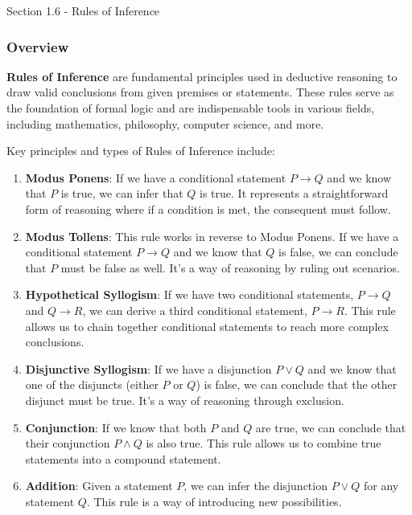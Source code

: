 \begin{notes}{Section 1.6 - Rules of Inference}
    \subsubsection*{Overview}

    \textbf{Rules of Inference} are fundamental principles used in deductive reasoning to draw valid conclusions from given premises or statements. These rules serve as the foundation of formal logic and are indispensable tools in various fields, including mathematics, philosophy, 
    computer science, and more.
    
    Key principles and types of Rules of Inference include:
    
    \begin{enumerate}
        \item \textbf{Modus Ponens}: If we have a conditional statement \(P \rightarrow Q\) and we know that \(P\) is true, we can infer that \(Q\) is true. It represents a straightforward form of reasoning where if a condition is met, the consequent must follow.
        
        \item \textbf{Modus Tollens}: This rule works in reverse to Modus Ponens. If we have a conditional statement \(P \rightarrow Q\) and we know that \(Q\) is false, we can conclude that \(P\) must be false as well. It's a way of reasoning by ruling out scenarios.
        
        \item \textbf{Hypothetical Syllogism}: If we have two conditional statements, \(P \rightarrow Q\) and \(Q \rightarrow R\), we can derive a third conditional statement, \(P \rightarrow R\). This rule allows us to chain together conditional statements to reach more complex conclusions.
        
        \item \textbf{Disjunctive Syllogism}: If we have a disjunction \(P \lor Q\) and we know that one of the disjuncts (either \(P\) or \(Q\)) is false, we can conclude that the other disjunct must be true. It's a way of reasoning through exclusion.
        
        \item \textbf{Conjunction}: If we know that both \(P\) and \(Q\) are true, we can conclude that their conjunction \(P \land Q\) is also true. This rule allows us to combine true statements into a compound statement.
        
        \item \textbf{Addition}: Given a statement \(P\), we can infer the disjunction \(P \lor Q\) for any statement \(Q\). This rule is a way of introducing new possibilities.
        

\end{enumerate}
\end{notes}
